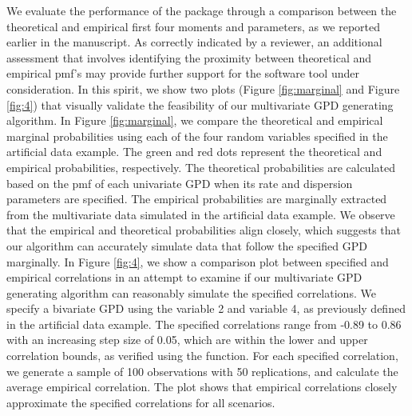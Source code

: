 We evaluate the performance of the package through a comparison between the theoretical and empirical first four moments and parameters, as we reported earlier in the manuscript. As correctly indicated by a reviewer, an additional assessment that involves identifying the proximity between theoretical and empirical pmf's may provide further support for the software tool under consideration. In this spirit, we show two plots (Figure \ref{fig:marginal} and Figure \ref{fig:4}) that visually validate the feasibility of our multivariate GPD generating algorithm. In Figure \ref{fig:marginal}, we compare the theoretical and empirical marginal probabilities using each of the four random variables specified in the artificial data example. The green and red dots represent the theoretical and empirical probabilities, respectively. The theoretical probabilities are calculated based on the pmf of each univariate GPD when its rate and dispersion parameters are specified. The empirical probabilities are marginally extracted from the multivariate data simulated in the artificial data example. We observe that the empirical and theoretical probabilities align closely, which suggests that our algorithm can accurately simulate data that follow the specified GPD marginally. In Figure \ref{fig:4}, we show a comparison plot between specified and empirical correlations in an attempt to examine if our multivariate GPD generating algorithm can reasonably simulate the specified correlations. We specify a bivariate GPD using the variable 2 and variable 4, as previously defined in the artificial data example. The specified correlations range from -0.89 to 0.86 with an increasing step size of 0.05, which are within the lower and upper correlation bounds, as verified using the  function. For each specified correlation, we generate a sample of 100 observations with 50 replications, and calculate the average empirical correlation. The plot shows that empirical correlations closely approximate the specified correlations for all scenarios.


